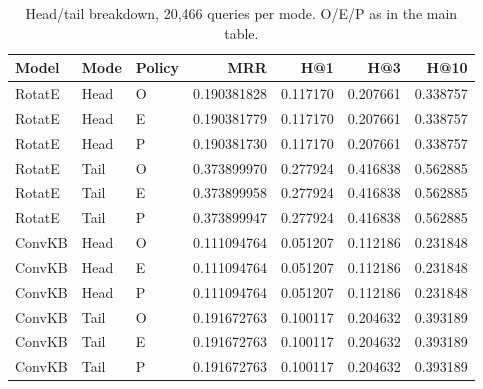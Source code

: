 \begin{table}[t]
\centering
\small
\setlength{\tabcolsep}{3pt}
\caption{Head/tail breakdown, 20,466 queries per mode. O/E/P as in the main table.}
\label{tab:gosha-head-tail}
\begin{tabular*}{\textwidth}{@{\extracolsep{\fill}}lllrrrr@{}}
\toprule
Model & Mode & Policy & MRR & H@1 & H@3 & H@10 \\
\midrule
RotatE & Head & O & 0.190381828 & 0.117170 & 0.207661 & 0.338757 \\
RotatE & Head & E & 0.190381779 & 0.117170 & 0.207661 & 0.338757 \\
RotatE & Head & P & 0.190381730 & 0.117170 & 0.207661 & 0.338757 \\
RotatE & Tail & O & 0.373899970 & 0.277924 & 0.416838 & 0.562885 \\
RotatE & Tail & E & 0.373899958 & 0.277924 & 0.416838 & 0.562885 \\
RotatE & Tail & P & 0.373899947 & 0.277924 & 0.416838 & 0.562885 \\
ConvKB & Head & O & 0.111094764 & 0.051207 & 0.112186 & 0.231848 \\
ConvKB & Head & E & 0.111094764 & 0.051207 & 0.112186 & 0.231848 \\
ConvKB & Head & P & 0.111094764 & 0.051207 & 0.112186 & 0.231848 \\
ConvKB & Tail & O & 0.191672763 & 0.100117 & 0.204632 & 0.393189 \\
ConvKB & Tail & E & 0.191672763 & 0.100117 & 0.204632 & 0.393189 \\
ConvKB & Tail & P & 0.191672763 & 0.100117 & 0.204632 & 0.393189 \\
\bottomrule
\end{tabular*}
\end{table}
